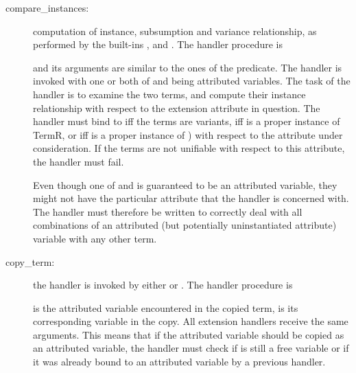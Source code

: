 \begin{description}
\item [compare_instances:]
  computation of instance, subsumption
and variance relationship, as performed by the built-ins
,
 and
.
The handler procedure is
\begin{quote}
\end{quote}
and its arguments are similar to the ones of the
predicate.
The handler is invoked with one or both of  and  being
attributed variables. The task of the handler is to examine the two terms,
and compute their instance relationship with respect to the extension
attribute in question.  The handler must
bind  to \notation{=} iff the terms are variants,
\notation{<} iff  is a proper instance of TermR, or \notation{>}
iff  is a proper instance of ) with respect to
the attribute under consideration. If the terms are not unifiable with respect
to this attribute, the handler must fail.

Even though one of  and  is guaranteed to be
an attributed variable, they might not have the particular attribute that
the handler is concerned with.  The handler must therefore be written to
correctly deal with all combinations of an attributed (but potentially
uninstantiated attribute) variable with any other term.


\item [copy_term:]
  the handler is invoked by either
 or
.
The handler procedure is
\begin{quote}
\end{quote}
 is the attributed variable encountered in the
copied term,  is its corresponding variable in the copy.
All extension handlers receive the same arguments.
This means that if the attributed variable should be copied as
an attributed variable, the handler must check if  is still
a free variable or if it was already bound to an attributed variable by a
previous handler.


\end{description}
